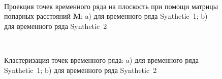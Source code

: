 \documentclass[12pt, twoside]{article}
\numberwithin{equation}{section}
\begin{document}
\begin{figure}[h!t]\center
{}
\\
\caption{Проекция точек временного ряда на плоскость при помощи матрицы попарных расстояний $\textbf{M}$: a) для временного ряда Synthetic~1; b) для временного ряда Synthetic~2}
\label{fig_synthetic_2D}
\end{figure}

\begin{figure}[h!t]\center
{}
\\
\caption{Кластеризация точек временного ряда: a) для временного ряда Synthetic~1; b) для временного ряда Synthetic~2}
\label{fig_synthetic_claster}
\end{figure}
\end{document}
